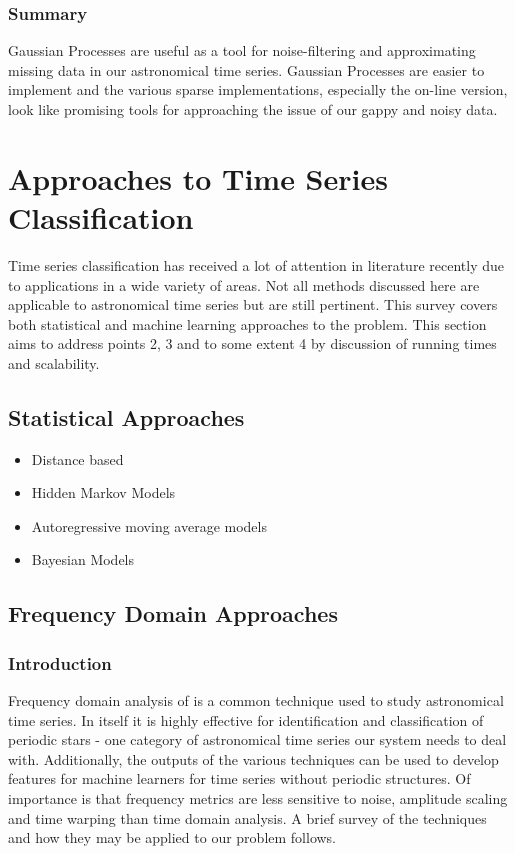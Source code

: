 \documentclass[11pt]{article}
\begin{document}
	\subsubsection{Summary}
	Gaussian Processes are useful as a tool for noise-filtering and approximating missing data in our astronomical time series. Gaussian Processes are easier to implement and the various sparse implementations, especially the on-line version, look like promising tools for approaching the issue of our gappy and noisy data.
	
	\section{Approaches to Time Series Classification}
	Time series classification has received a lot of attention in literature recently due to applications in a wide variety of areas. Not all methods discussed here are applicable to astronomical time series but are still pertinent. This survey covers both statistical and machine learning approaches to the problem. This section aims to address points 2, 3 and to some extent 4 by discussion of running times and scalability.

	\subsection{Statistical Approaches}
	\begin{itemize}
		\item Distance based
		\item Hidden Markov Models
		\item Autoregressive moving average models
		\item Bayesian Models
	\end{itemize}
	\subsection{Frequency Domain Approaches}
	\subsubsection{Introduction}
	Frequency domain analysis of is a common technique used to study astronomical time series. In itself it is highly effective for identification and classification of periodic stars - one category of astronomical time series our system needs to deal with. Additionally, the outputs of the various techniques can be used to develop features for machine learners for time series without periodic structures. Of importance is that frequency metrics are less sensitive to noise, amplitude scaling and time warping than time domain analysis. A brief survey of the techniques and how they may be applied to our problem follows.
\end{document}
